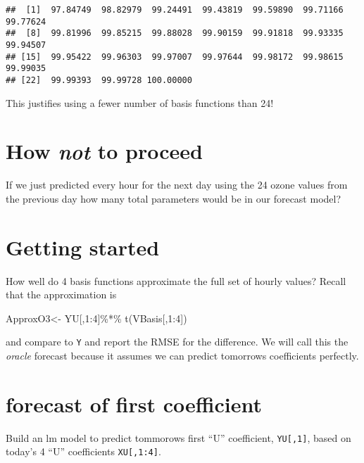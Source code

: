 \documentclass[
]{article}
\newenvironment{Shaded}{\begin{snugshade}}{\end{snugshade}}
\newcommand{\DecValTok}[1]{\textcolor[rgb]{0.00,0.00,0.81}{#1}}
\newcommand{\FunctionTok}[1]{\textcolor[rgb]{0.00,0.00,0.00}{#1}}
\newcommand{\NormalTok}[1]{#1}
\newcommand{\OtherTok}[1]{\textcolor[rgb]{0.56,0.35,0.01}{#1}}
\newcommand{\SpecialCharTok}[1]{\textcolor[rgb]{0.00,0.00,0.00}{#1}}
\begin{document}
\begin{verbatim}
##  [1]  97.84749  98.82979  99.24491  99.43819  99.59890  99.71166  99.77624
##  [8]  99.81996  99.85215  99.88028  99.90159  99.91818  99.93335  99.94507
## [15]  99.95422  99.96303  99.97007  99.97644  99.98172  99.98615  99.99035
## [22]  99.99393  99.99728 100.00000
\end{verbatim}

This justifies using a fewer number of basis functions than 24!

\hypertarget{how-not-to-proceed}{%
\section{\texorpdfstring{How \emph{not} to
proceed}{How not to proceed}}\label{how-not-to-proceed}}

If we just predicted every hour for the next day using the 24 ozone
values from the previous day how many total parameters would be in our
forecast model?

\hypertarget{getting-started}{%
\section{Getting started}\label{getting-started}}

How well do 4 basis functions approximate the full set of hourly values?
Recall that the approximation is

\begin{Shaded}
\begin{Highlighting}[]
\NormalTok{ApproxO3}\OtherTok{\textless{}{-}}\NormalTok{ YU[,}\DecValTok{1}\SpecialCharTok{:}\DecValTok{4}\NormalTok{]}\SpecialCharTok{\%*\%} \FunctionTok{t}\NormalTok{(VBasis[,}\DecValTok{1}\SpecialCharTok{:}\DecValTok{4}\NormalTok{])}
\end{Highlighting}
\end{Shaded}

and compare to \texttt{Y} and report the RMSE for the difference. We
will call this the \emph{oracle} forecast because it assumes we can
predict tomorrows coefficients perfectly.

\hypertarget{forecast-of-first-coefficient}{%
\section{forecast of first
coefficient}\label{forecast-of-first-coefficient}}

Build an lm model to predict tommorows first ``U'' coefficient,
\texttt{YU{[},1{]}}, based on today's 4 ``U'' coefficients
\texttt{XU{[},1:4{]}}.
\end{document}
